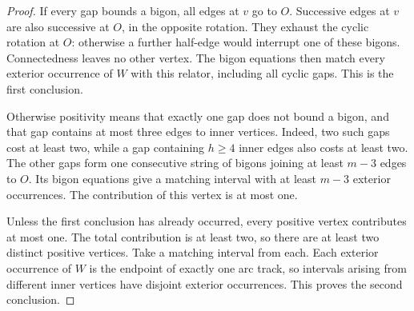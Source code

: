 \begin{proof}
If every gap bounds a bigon, all edges at $v$ go to $O$.  Successive
edges at $v$ are also successive at $O$, in the opposite rotation.
They exhaust the cyclic rotation at $O$: otherwise a further half-edge
would interrupt one of these bigons.  Connectedness leaves no other
vertex.  The bigon equations then match every exterior occurrence of
$W$ with this relator, including all cyclic gaps.  This is the first
conclusion.

Otherwise positivity means that exactly one gap does not bound a
bigon, and that gap contains at most three edges to inner vertices.
Indeed, two such gaps cost at least two, while a gap containing
$h\geq4$ inner edges also costs at least two.  The other gaps form one
consecutive string of bigons joining at least $m-3$ edges to $O$.
Its bigon equations give a matching interval with at least $m-3$
exterior occurrences.  The contribution of this vertex is at most one.

Unless the first conclusion has already occurred, every positive
vertex contributes at most one.  The total contribution is at least
two, so there are at least two distinct positive vertices.  Take a
matching interval from each.  Each exterior occurrence of $W$ is the
endpoint of exactly one arc track, so intervals arising from different
inner vertices have disjoint exterior occurrences.  This proves the
second conclusion.
\end{proof}
